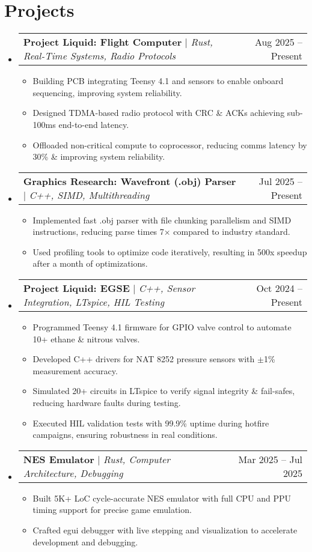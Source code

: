 \documentclass[letterpaper,11pt]{article}
\makeatletter
\newcommand{\resumeItem}[1]{
  \item\small{
    {#1 \vspace{-2pt}}
  }
}
\newcommand{\resumeProjectHeading}[2]{
    \item
    \begin{tabular*}{0.97\textwidth}{l@{\extracolsep{\fill}}r}
      \small#1 & #2 \\
    \end{tabular*}\vspace{-7pt}
}
\newcommand{\resumeSubHeadingListStart}{\begin{itemize}[leftmargin=0.15in, label={}]}
\newcommand{\resumeSubHeadingListEnd}{\end{itemize}}
\newcommand{\resumeItemListStart}{\begin{itemize}}
\newcommand{\resumeItemListEnd}{\end{itemize}\vspace{-5pt}}
\makeatother
\begin{document}
\section{Projects}
    \resumeSubHeadingListStart
        \resumeProjectHeading
          {\textbf{Project Liquid: Flight Computer} $|$ \emph{Rust, Real-Time Systems, Radio Protocols}}{Aug 2025 -- Present}
          \resumeItemListStart
            \resumeItem{Building PCB integrating Teensy 4.1 and sensors to enable onboard sequencing, improving system reliability.}
            \resumeItem{Designed TDMA-based radio protocol with CRC \& ACKs achieving sub-100ms end-to-end latency.}
            \resumeItem{Offloaded non-critical compute to coprocessor, reducing comms latency by 30\% \& improving system reliability.}
          \resumeItemListEnd
        \resumeProjectHeading
          {\textbf{Graphics Research: Wavefront (.obj) Parser} $|$ \emph{C++, SIMD, Multithreading}}{Jul 2025 -- Present}
          \resumeItemListStart
            \resumeItem{Implemented fast .obj parser with file chunking parallelism and SIMD instructions, reducing parse times 7× compared to industry standard.}
            \resumeItem{Used profiling tools to optimize code iteratively, resulting in 500x speedup after a month of optimizations.}
          \resumeItemListEnd
        \resumeProjectHeading
          {\textbf{Project Liquid: EGSE} $|$ \emph{C++, Sensor Integration, LTspice, HIL Testing}}{Oct 2024 -- Present}
          \resumeItemListStart
            \resumeItem{Programmed Teensy 4.1 firmware for GPIO valve control to automate 10+ ethane \& nitrous valves.}
            \resumeItem{Developed C++ drivers for NAT 8252 pressure sensors with $\pm$1\% measurement accuracy.}
            \resumeItem{Simulated 20+ circuits in LTspice to verify signal integrity \& fail-safes, reducing hardware faults during testing.}
            \resumeItem{Executed HIL validation tests with 99.9\% uptime during hotfire campaigns, ensuring robustness in real conditions.}
          \resumeItemListEnd
        \resumeProjectHeading
          {\textbf{NES Emulator} $|$ \emph{Rust, Computer Architecture, Debugging}}{Mar 2025 -- Jul 2025}
          \resumeItemListStart
            \resumeItem{Built 5K+ LoC cycle-accurate NES emulator with full CPU and PPU timing support for precise game emulation.}
            \resumeItem{Crafted egui debugger with live stepping and visualization to accelerate development and debugging.}
          \resumeItemListEnd
    \resumeSubHeadingListEnd
\end{document}
